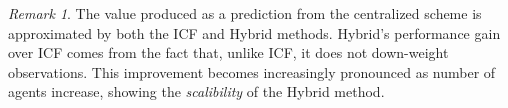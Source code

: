\documentclass[conference]{IEEEtran}
\theoremstyle{remark}
\newtheorem{remark}{Remark}
\newcommand{\bIs}[1]{\boldsymbol{I}_{#1}}  %
\newcommand{\suf}[1]{\textsc{\tiny #1}}  %
\begin{document}
%
%
\begin{remark}
	The value produced as a prediction from the centralized scheme is approximated 
	by both the ICF and Hybrid  methods. Hybrid's
	performance gain over ICF comes from the fact that, unlike 
	ICF, it does not down-weight observations. This improvement becomes increasingly
	pronounced as number of agents increase, showing the \textit{scalibility} 
	of the Hybrid method.
\end{remark}
\end{document}
